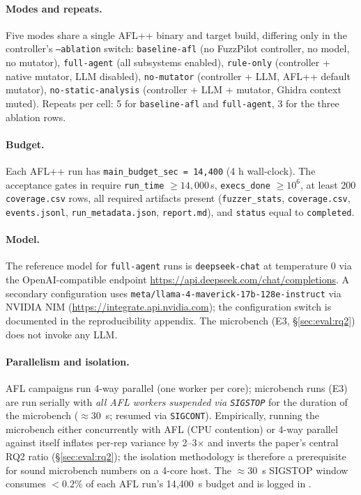 \documentclass[11pt]{article}
\newcommand{\nimmodeid}{\texttt{meta/\allowbreak{}llama-4-\allowbreak{}maverick-\allowbreak{}17b-\allowbreak{}128e-\allowbreak{}instruct}}
\begin{document}
\paragraph{Modes and repeats.}
Five modes share a single AFL++ binary and target build, differing
only in the controller's \texttt{--ablation} switch:
\texttt{baseline-afl} (no FuzzPilot controller, no model, no
mutator), \texttt{full-agent} (all subsystems enabled),
\texttt{rule-only} (controller + native mutator, LLM disabled),
\texttt{no-mutator} (controller + LLM, AFL++ default mutator),
\texttt{no-static-analysis} (controller + LLM + mutator, Ghidra
context muted). Repeats per cell: 5 for \texttt{baseline-afl} and
\texttt{full-agent}, 3 for the three ablation rows.

\paragraph{Budget.}
Each AFL++ run has \texttt{main\_budget\_sec = 14{,}400}
(4 h wall-clock). The acceptance gates in
 require
\texttt{run\_time} $\geq 14{,}000$\,s, \texttt{execs\_done}
$\geq 10^6$, at least 200 \texttt{coverage.csv} rows, all required
artifacts present (\texttt{fuzzer\_stats}, \texttt{coverage.csv},
\texttt{events.jsonl}, \texttt{run\_metadata.json},
\texttt{report.md}), and \texttt{status} equal to
\texttt{completed}.

\paragraph{Model.}
The reference model for \texttt{full-agent} runs is
\texttt{deepseek-chat} at temperature 0 via the OpenAI-compatible
endpoint \url{https://api.deepseek.com/chat/completions}. A
secondary configuration uses
\nimmodeid{} via NVIDIA NIM
(\url{https://integrate.api.nvidia.com}); the configuration switch is
documented in the reproducibility appendix. The microbench (E3,
\S\ref{sec:eval:rq2}) does not invoke any LLM.

\paragraph{Parallelism and isolation.}
AFL campaigns run 4-way parallel (one worker per core); microbench
runs (E3) are run serially with \emph{all AFL workers suspended via
\texttt{SIGSTOP}} for the duration of the microbench
($\approx 30$~s; resumed via \texttt{SIGCONT}). Empirically, running
the microbench either concurrently with AFL (CPU contention) or
4-way parallel against itself inflates per-rep variance by 2--3$\times$
and inverts the paper's central RQ2 ratio (\S\ref{sec:eval:rq2}); the
isolation methodology is therefore a prerequisite for sound microbench
numbers on a 4-core host. The
$\approx 30$~s SIGSTOP window consumes $< 0.2\%$ of each AFL run's
14{,}400~s budget and is logged in
.
\end{document}
